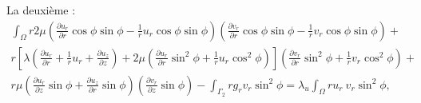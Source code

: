 \documentclass[a4paper,11pt]{article}   %
\begin{document}
La deuxième :\\
\begin{eqnarray*} 
\int_{\Omega} r 2\mu \left(\frac{\partial u_r}{\partial r}\cos\phi\sin\phi - \frac{1}{r}u_r \cos\phi\sin\phi\right)\left(\frac{\partial v_r}{\partial r}\cos\phi\sin\phi - \frac{1}{r}v_r \cos\phi\sin\phi\right) +\\  r \left[\lambda (\frac{\partial u_r}{\partial r} + \frac{1}{r} u_r + \frac{\partial u_z}{\partial z}) + 2 \mu (\frac{\partial u_r}{\partial r}\sin^2\phi + \frac{1}{r} u_r\cos^2\phi)\right] (\frac{\partial v_r}{\partial r}\sin^2\phi + \frac{1}{r} v_r\cos^2\phi) + \\  r \mu \left(\frac{\partial u_r}{\partial z}\sin\phi + \frac{\partial u_z}{\partial r}\sin\phi\right)(\frac{\partial v_r}{\partial z}\sin\phi)  - \int_{\Gamma_2}r g_r v_r \sin^2 \phi =\lambda _u \int_{\Omega}r u_r\ v_r \sin^2 \phi,\\ \end{eqnarray*} 
\end{document}
